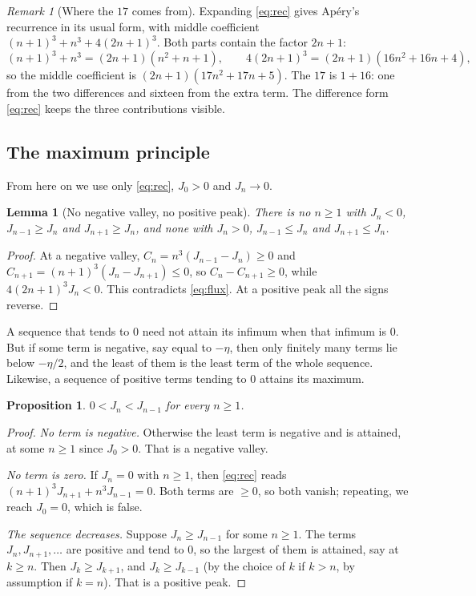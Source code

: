 \documentclass[11pt]{article}
\theoremstyle{plain}
\newtheorem{lemma}[theorem]{Lemma}
\newtheorem{proposition}[theorem]{Proposition}
\theoremstyle{definition}
\theoremstyle{remark}
\newtheorem{remark}[theorem]{Remark}
\begin{document}
\begin{remark}[Where the $17$ comes from]
Expanding \eqref{eq:rec} gives Ap\'ery's recurrence in its usual form, with middle coefficient
$(n+1)^3+n^3+4(2n+1)^3$. Both parts contain the factor $2n+1$:
\[
  (n+1)^3+n^3=(2n+1)(n^2+n+1),\qquad 4(2n+1)^3=(2n+1)(16n^2+16n+4),
\]
so the middle coefficient is $(2n+1)(17n^2+17n+5)$.
The $17$ is $1+16$: one from the two differences and sixteen from the extra term. The difference form
\eqref{eq:rec} keeps the three contributions visible.
\end{remark}

\subsection{The maximum principle}

From here on we use only \eqref{eq:rec}, $J_0>0$ and $J_n\to0$.

\begin{lemma}[No negative valley, no positive peak]\label{lem:nopeak}
There is no $n\ge1$ with $J_n<0$, $J_{n-1}\ge J_n$ and $J_{n+1}\ge J_n$, and none with $J_n>0$,
$J_{n-1}\le J_n$ and $J_{n+1}\le J_n$.
\end{lemma}

\begin{proof}
At a negative valley, $C_n=n^3(J_{n-1}-J_n)\ge0$ and $C_{n+1}=(n+1)^3(J_n-J_{n+1})\le0$, so
$C_n-C_{n+1}\ge0$, while $4(2n+1)^3J_n<0$. This contradicts \eqref{eq:flux}. At a positive peak
all the signs reverse.
\end{proof}

A sequence that tends to $0$ need not attain its infimum when that infimum is $0$. But if some term
is negative, say equal to $-\eta$, then only finitely many terms lie below $-\eta/2$, and the least
of them is the least term of the whole sequence. Likewise, a sequence of positive terms tending to
$0$ attains its maximum.

\begin{proposition}\label{prop:decreasing}
$0<J_n<J_{n-1}$ for every $n\ge1$.
\end{proposition}

\begin{proof}
\emph{No term is negative.} Otherwise the least term is negative and is attained, at some $n\ge1$
since $J_0>0$. That is a negative valley.

\emph{No term is zero.} If $J_n=0$ with $n\ge1$, then \eqref{eq:rec} reads
$(n+1)^3J_{n+1}+n^3J_{n-1}=0$. Both terms are $\ge0$, so both vanish; repeating, we reach $J_0=0$,
which is false.

\emph{The sequence decreases.} Suppose $J_n\ge J_{n-1}$ for some $n\ge1$. The terms
$J_n,J_{n+1},\dots$ are positive and tend to $0$, so the largest of them is attained, say at $k\ge n$.
Then $J_k\ge J_{k+1}$, and $J_k\ge J_{k-1}$ (by the choice of $k$ if $k>n$, by assumption if $k=n$).
That is a positive peak.
\end{proof}
\end{document}
